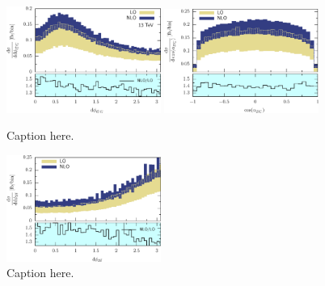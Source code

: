 \documentclass[preprint]{JHEP3} %
\begin{document}
\begin{figure}[h]
\centering %
\includegraphics[width=0.45\textwidth]{./LHC_53_Fig17.eps}
\hfill
\includegraphics[width=0.45\textwidth]{./LHC_53_Fig18.eps}
\caption{\label{fig:i} Caption here.}
\end{figure}




\begin{figure}[h]
\centering %
\includegraphics[width=0.45\textwidth]{./LHC_53_Fig19.eps}
\caption{\label{fig:i} Caption here.}
\end{figure}






\end{document}
